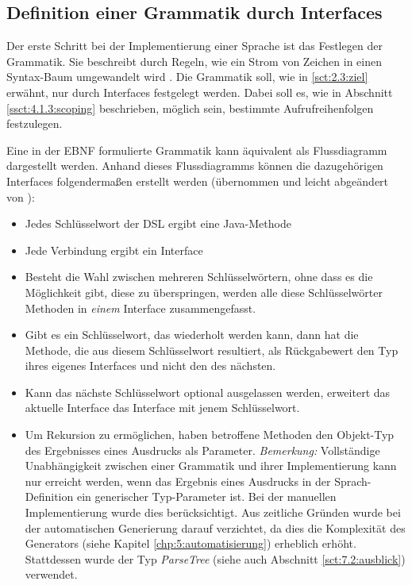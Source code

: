 \subsection{Definition einer Grammatik durch Interfaces}\label{ssct:4.3.1:grammatik}
Der erste Schritt bei der Implementierung einer Sprache ist das Festlegen der Grammatik. Sie beschreibt durch Regeln, wie ein Strom von Zeichen in einen Syntax-Baum umgewandelt wird \cite{book:fowlerDSL}. Die Grammatik soll, wie in \ref{sct:2.3:ziel} erwähnt, nur durch Interfaces festgelegt werden. Dabei soll es, wie in Abschnitt \ref{ssct:4.1.3:scoping} beschrieben, möglich sein, bestimmte Aufrufreihenfolgen festzulegen.

Eine in der EBNF formulierte Grammatik kann äquivalent als Flussdiagramm dargestellt werden. Anhand dieses Flussdiagramms können die dazugehörigen Interfaces folgendermaßen erstellt werden (übernommen und leicht abgeändert von \cite{www:jooq:fluentAPI}):

\begin{itemize}
	\item Jedes Schlüsselwort der DSL ergibt eine Java-Methode
	\item Jede Verbindung ergibt ein Interface
	\item Besteht die Wahl zwischen mehreren Schlüsselwörtern, ohne dass es die Möglichkeit gibt, diese zu überspringen, werden alle diese Schlüsselwörter Methoden in \emph{einem} Interface zusammengefasst.
	\item Gibt es ein Schlüsselwort, das wiederholt werden kann, dann hat die Methode, die aus diesem Schlüsselwort resultiert, als Rückgabewert den Typ ihres eigenes Interfaces und nicht den des nächsten.
	\item Kann das nächste Schlüsselwort optional ausgelassen werden, erweitert das aktuelle Interface das Interface mit jenem Schlüsselwort.
	\item Um Rekursion zu ermöglichen, haben betroffene Methoden den Objekt-Typ des Ergebnisses eines Ausdrucks als Parameter. \emph{Bemerkung:} Vollständige Unabhängigkeit zwischen einer Grammatik und ihrer Implementierung kann nur erreicht werden, wenn das Ergebnis eines Ausdrucks in der Sprach-Definition ein generischer Typ-Parameter ist. Bei der manuellen Implementierung wurde dies berücksichtigt. Aus zeitliche Gründen wurde bei der automatischen Generierung darauf verzichtet, da dies die Komplexität des Generators (siehe Kapitel \ref{chp:5:automatisierung}) erheblich erhöht. Stattdessen wurde der Typ \emph{ParseTree} (siehe auch Abschnitt \ref{sct:7.2:ausblick}) verwendet.
\end{itemize}

